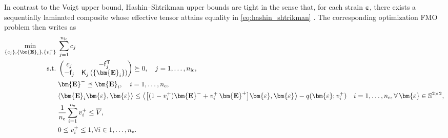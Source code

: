 \documentclass[preprint,3p]{elsarticle}
\newcommand{\tenss}[1]{\bm{\mathbf{#1}}}            %
\newcommand{\tensf}[1]{\bm{\mathbf{#1}}}            %
\newcommand{\trn}{\mathsf{T}}                       %
\newcommand{\strain}{\tenss{\varepsilon}}           %
\newcommand{\Ei}{\tensf{E}_i}                       %
\newcommand{\Emin}{\tensf{E}^{-}}                   %
\newcommand{\Emax}{\tensf{E}^{+}}                   %
\newcommand{\nel}{n_\mathrm{e}}                     %
\newcommand{\nlc}{n_\mathrm{lc}}                    %
\newcommand{\semtrx}[1]{\ifcat\noexpand#1\relax\bm{#1}\else\mathsf{#1}\fi}
\newcommand{\sevek}[1]{\ifcat\noexpand#1\relax\bm{#1}\else\mathsf{#1}\fi}
\begin{document}
In contrast to the Voigt upper bound, Hashin--Shtrikman upper bounds are tight in the sense that, for each strain $\strain$, there exists a sequentially laminated composite whose effective tensor attains equality in \eqref{eq:hashin_shtrikman} \citep{Allaire1993wo,Allaire1993}. The corresponding optimization FMO problem then writes as
%
\begin{subequations}\label{eq:fmo_hashin}
\begin{align}
    \min_{\{c_j\}, \{\tensf{E}_{i}\}, \{v_i^+\}} \; & \sum_{j=1}^{\nlc} c_j \label{eq:fmo_hashin_compliance}\\
    \mathrm{s.t.}\; & \begin{pmatrix}
        c_j & -\sevek{f}_j^\trn\\
        -\sevek{f}_j & \semtrx{K}_j\left(\{\Ei\}\right)
    \end{pmatrix}\succeq 0, \quad j = 1,\dots,\nlc,\label{eq:fmo_hashin_lmi}\\
    & \Emin \preceq \Ei,\quad i = 1,\dots,\nel,\\
    & \langle \Ei \strain, \strain \rangle \le \big\langle \big[(1-v_i^+)\Emin+v_i^+\,\Emax\big]\strain,\strain\big\rangle - q(\strain;v_i^+)\quad i = 1,\dots,\nel, \forall\,\strain\in\mathbb{S}^{2\times2},\label{eq:fmo_hashin_so}\\
    & \frac{1}{\nel}\sum_{i=1}^{\nel} v_i^+ \le \overline{V},\label{eq:fmo_hashin_volume}\\
    & 0 \le v_i^+ \le 1, \forall i \in 1,\dots,\nel.
\end{align}
\end{subequations}
\end{document}
